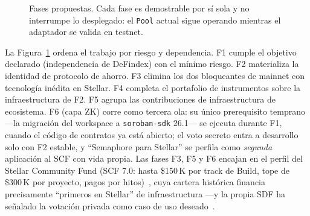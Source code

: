 \documentclass[twocolumn,10pt]{article}
\begin{document}
\begin{figure}[t]
\centering
{}
\caption{Fases propuestas. Cada fase es demostrable por s\'i sola y no interrumpe lo desplegado: el \texttt{Pool} actual sigue operando mientras el adaptador se valida en testnet.}
\label{fig:roadmap}
\end{figure}

La Figura~\ref{fig:roadmap} ordena el trabajo por riesgo y dependencia. F1 cumple el objetivo declarado (independencia de DeFindex) con el m\'inimo riesgo. F2 materializa la identidad de protocolo de ahorro. F3 elimina los dos bloqueantes de mainnet con tecnolog\'ia in\'edita en Stellar. F4 completa el portafolio de instrumentos sobre la infraestructura de F2. F5 agrupa las contribuciones de infraestructura de ecosistema. F6 (capa ZK) corre como tercera ola: su \'unico prerequisito temprano ---la migraci\'on del workspace a \texttt{soroban-sdk} 26.1--- se ejecuta durante F1, cuando el c\'odigo de contratos ya est\'a abierto; el voto secreto entra a desarrollo solo con F2 estable, y ``Semaphore para Stellar'' se perfila como \emph{segunda} aplicaci\'on al SCF con vida propia. Las fases F3, F5 y F6 encajan en el perfil del Stellar Community Fund (SCF 7.0: hasta \$150\,K por track de Build, tope de \$300\,K por proyecto, pagos por hitos)~\cite{scf}, cuya cartera hist\'orica financia precisamente ``primeros en Stellar'' de infraestructura ---y la propia SDF ha se\~nalado la votaci\'on privada como caso de uso deseado~\cite{zk5}.
\end{document}
